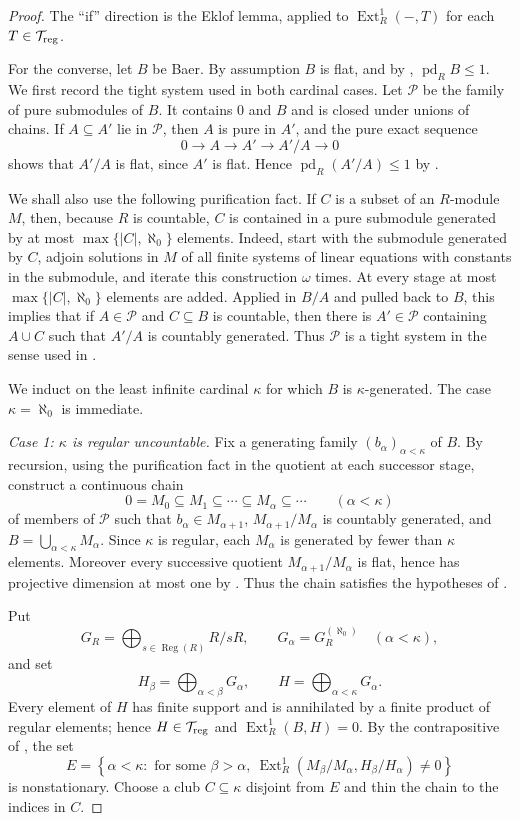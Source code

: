 \documentclass[11pt]{article}
\theoremstyle{definition}
\theoremstyle{remark}
\newcommand{\Reg}{\operatorname{Reg}}
\newcommand{\pd}{\operatorname{pd}}
\newcommand{\Ext}{\operatorname{Ext}}
\newcommand{\Tors}{\mathcal T_{\rm reg}}
\begin{document}
\begin{proof}
The ``if'' direction is the Eklof lemma, applied to $\Ext_R^1(-,T)$ for each
$T\in\Tors$.

For the converse, let $B$ be Baer.  By assumption $B$ is flat, and by
, $\pd_RB\le1$.  We first record the tight system used in both
cardinal cases.  Let $\mathscr P$ be the family of pure submodules of $B$.  It
contains $0$ and $B$ and is closed under unions of chains.  If
$A\subseteq A'$ lie in $\mathscr P$, then $A$ is pure in $A'$, and the pure
exact sequence
\[
 0\longrightarrow A\longrightarrow A'\longrightarrow A'/A\longrightarrow0
\]
shows that $A'/A$ is flat, since $A'$ is flat.  Hence
$\pd_R(A'/A)\le1$ by .

We shall also use the following purification fact.  If $C$ is a subset of an
$R$-module $M$, then, because $R$ is countable, $C$ is contained in a pure
submodule generated by at most $\max\{|C|,\aleph_0\}$ elements.  Indeed, start
with the submodule generated by $C$, adjoin solutions in $M$ of all finite
systems of linear equations with constants in the submodule, and iterate this
construction $\omega$ times.  At every stage at most
$\max\{|C|,\aleph_0\}$ elements are added.  Applied in $B/A$ and pulled back
to $B$, this implies that if $A\in\mathscr P$ and $C\subseteq B$ is
countable, then there is $A'\in\mathscr P$ containing $A\cup C$ such that
$A'/A$ is countably generated.  Thus $\mathscr P$ is a tight system in the
sense used in \cite[Section~3]{EFS}.

We induct on the least infinite cardinal $\kappa$ for which $B$ is
$\kappa$-generated.  The case $\kappa=\aleph_0$ is immediate.

\smallskip
\noindent\emph{Case 1: $\kappa$ is regular uncountable.}
Fix a generating family $(b_\alpha)_{\alpha<\kappa}$ of $B$.  By recursion,
using the purification fact in the quotient at each successor stage, construct
a continuous chain
\[
 0=M_0\subseteq M_1\subseteq\cdots\subseteq M_\alpha\subseteq\cdots
 \qquad(\alpha<\kappa)
\]
of members of $\mathscr P$ such that $b_\alpha\in M_{\alpha+1}$,
$M_{\alpha+1}/M_\alpha$ is countably generated, and
$B=\bigcup_{\alpha<\kappa}M_\alpha$.  Since $\kappa$ is regular, each
$M_\alpha$ is generated by fewer than $\kappa$ elements.  Moreover every
successive quotient $M_{\alpha+1}/M_\alpha$ is flat, hence has projective
dimension at most one by .  Thus the chain satisfies the
hypotheses of \cite[Lemma~9]{EFS}.

Put
\[
 G_R=\bigoplus_{s\in\Reg(R)}R/sR,
 \qquad G_\alpha=G_R^{(\aleph_0)}\quad(\alpha<\kappa),
\]
and set
\[
 H_\beta=\bigoplus_{\alpha<\beta}G_\alpha,
 \qquad H=\bigoplus_{\alpha<\kappa}G_\alpha.
\]
Every element of $H$ has finite support and is annihilated by a finite product
of regular elements; hence $H\in\Tors$ and $\Ext_R^1(B,H)=0$.  By the
contrapositive of \cite[Lemma~9]{EFS}, the set
\[
 E=\left\{\alpha<\kappa:\text{ for some }\beta>\alpha,
 \ \Ext_R^1(M_\beta/M_\alpha,H_\beta/H_\alpha)\ne0\right\}
\]
is nonstationary.  Choose a club $C\subseteq\kappa$ disjoint from $E$ and
thin the chain to the indices in $C$.


\end{proof}
\end{document}
